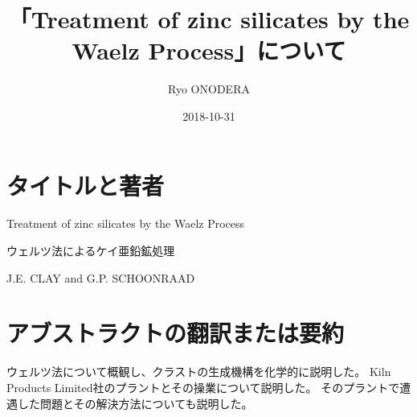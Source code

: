 \documentclass[a4j]{jsarticle}
\title{「Treatment of zinc silicates by the Waelz Process」について}
\author[1]{Ryo ONODERA}
\affil[1]{tetera.org}
\date{2018-10-31}
\begin{document}

\maketitle


\section{タイトルと著者}
Treatment of zinc silicates by the Waelz Process
~\cite{saimm-1976-08-waelz-znsio4}

ウェルツ法によるケイ亜鉛鉱処理

J.E. CLAY and G.P. SCHOONRAAD


\section{アブストラクトの翻訳または要約}
ウェルツ法について概観し、クラストの生成機構を化学的に説明した。
Kiln Products Limited社のプラントとその操業について説明した。
そのプラントで遭遇した問題とその解決方法についても説明した。
\end{document}
